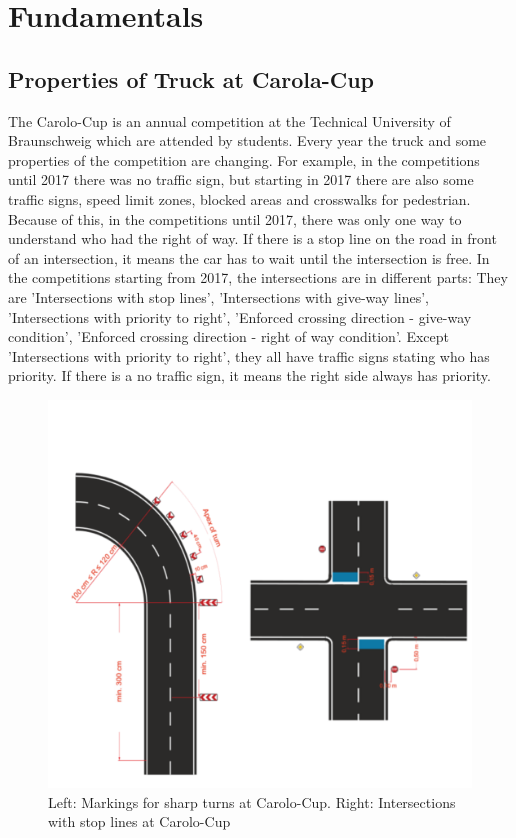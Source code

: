 %
\chapter{Fundamentals}\label{cha:Fundamentals}
%
%
\section{Properties of Truck at Carola-Cup}\label{sec:Properties of Truck at Carolo-Cup}
%
The Carolo-Cup is an annual competition at the Technical University of Braunschweig which are attended by students. Every year the truck and some properties of the competition are changing. For example, in the competitions until 2017 there was no traffic sign, but starting in 2017 there are also some traffic signs, speed limit zones, blocked areas and crosswalks for pedestrian. Because of this, in the competitions until 2017, there was only one way to understand who had the right of way. If there is a stop line on the road in front of an intersection, it means the car has to wait until the intersection is free. In the competitions starting from 2017, the intersections are in different parts: They are 'Intersections with stop lines', 'Intersections with give-way lines', 'Intersections with priority to right', 'Enforced crossing direction - give-way condition', 'Enforced crossing direction - right of way condition'. Except 'Intersections with priority to right', they all have traffic signs stating who has priority. If there is a no traffic sign, it means the right side always has priority.

\begin{figure}[H]
	\centering
	\hspace*{0cm}   
	\includegraphics[width=120mm,scale=1]{./Bilder/Intersections.png}
	\caption{Left: Markings for sharp turns at Carolo-Cup.
Right: Intersections with stop lines at Carolo-Cup}
\end{figure}


